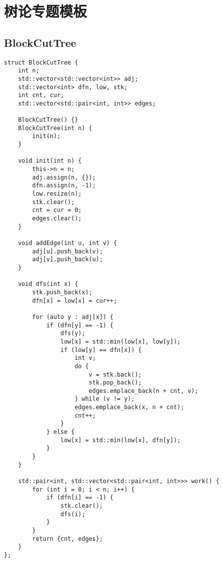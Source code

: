 \section{树论专题模板}
\subsection{BlockCutTree}
\begin{lstlisting}
struct BlockCutTree {
    int n;
    std::vector<std::vector<int>> adj;
    std::vector<int> dfn, low, stk;
    int cnt, cur;
    std::vector<std::pair<int, int>> edges;
    
    BlockCutTree() {}
    BlockCutTree(int n) {
        init(n);
    }
    
    void init(int n) {
        this->n = n;
        adj.assign(n, {});
        dfn.assign(n, -1);
        low.resize(n);
        stk.clear();
        cnt = cur = 0;
        edges.clear();
    }
    
    void addEdge(int u, int v) {
        adj[u].push_back(v);
        adj[v].push_back(u);
    }
    
    void dfs(int x) {
        stk.push_back(x);
        dfn[x] = low[x] = cur++;
        
        for (auto y : adj[x]) {
            if (dfn[y] == -1) {
                dfs(y);
                low[x] = std::min(low[x], low[y]);
                if (low[y] == dfn[x]) {
                    int v;
                    do {
                        v = stk.back();
                        stk.pop_back();
                        edges.emplace_back(n + cnt, v);
                    } while (v != y);
                    edges.emplace_back(x, n + cnt);
                    cnt++;
                }
            } else {
                low[x] = std::min(low[x], dfn[y]);
            }
        }
    }
    
    std::pair<int, std::vector<std::pair<int, int>>> work() {
        for (int i = 0; i < n; i++) {
            if (dfn[i] == -1) {
                stk.clear();
                dfs(i);
            }
        }
        return {cnt, edges};
    }
};
\end{lstlisting}

